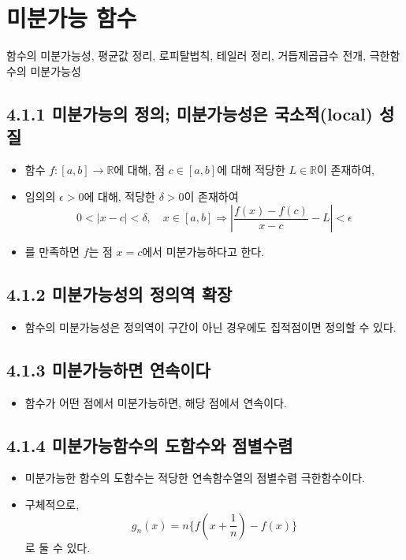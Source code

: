 \documentclass{article}
\begin{document}
\section{미분가능 함수}
함수의 미분가능성, 평균값 정리, 로피탈법칙, 테일러 정리, 거듭제곱급수 전개, 극한함수의 미분가능성


\subsection{\fontsize{11.5}{13}\selectfont{함수의 극한의 개념은 집적점에서 출발한다.}}

\subsection*{\textmd{4.1.1 미분가능의 정의; 미분가능성은 국소적(local) 성질}} 
\begin{itemize}
    \item 함수 \( f: [a,b] \to \mathbb{R} \)에 대해, 점 \( c \in [a,b] \)에 대해 적당한 \( L \in \mathbb{R} \)이 존재하여,
    \item 임의의 \( \epsilon > 0 \)에 대해, 적당한 \( \delta > 0 \)이 존재하여
    \[ 0 < |x - c| < \delta, \quad x \in [a,b] \Rightarrow \left| \frac{f(x) - f(c)}{x - c} - L \right| < \epsilon \]
    \item 를 만족하면 \( f \)는 점 \( x = c \)에서 미분가능하다고 한다.
\end{itemize}

\subsection*{\textmd{4.1.2 미분가능성의 정의역 확장}} 
\begin{itemize}
    \item 함수의 미분가능성은 정의역이 구간이 아닌 경우에도 집적점이면 정의할 수 있다.
\end{itemize}

\subsection*{\textmd{4.1.3 미분가능하면 연속이다}} 
\begin{itemize}
    \item 함수가 어떤 점에서 미분가능하면, 해당 점에서 연속이다.
\end{itemize}

\subsection*{\textmd{4.1.4 미분가능함수의 도함수와 점별수렴}} 
\begin{itemize}
    \item 미분가능한 함수의 도함수는 적당한 연속함수열의 점별수렴 극한함수이다.
    \item 구체적으로, \[ g_n(x) = n \{ f(x + \frac{1}{n}) - f(x) \} \]로 둘 수 있다.
\end{itemize}
\end{document}
